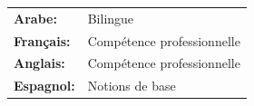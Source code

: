 
\renewcommand{\arraystretch}{1.1}

\begin{tabular}{>{\bfseries}l l}
    \textbf{Arabe:}             & Bilingue  \\
    \textbf{Français:}          & Compétence professionnelle \\
    \textbf{Anglais:}           & Compétence professionnelle \\
    \textbf{Espagnol:}          & Notions de base \\
\end{tabular}

